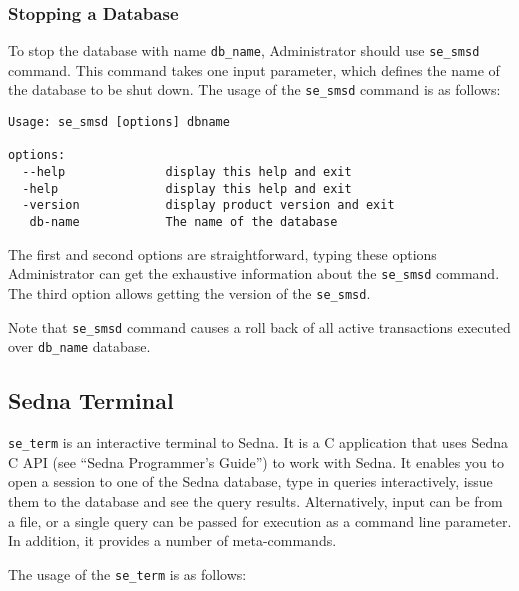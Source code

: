 \documentclass[a4paper,12pt]{article}
\begin{document}
\subsubsection{Stopping a Database}
\label{StopDB}

To stop the database with name \verb!db_name!, Administrator should use
\verb!se_smsd! command. This command takes one input parameter, which defines
the name of the database to be shut down. The usage of the \verb!se_smsd!
command is as follows:

\small{
\begin{verbatim}
Usage: se_smsd [options] dbname

options:
  --help              display this help and exit
  -help               display this help and exit
  -version            display product version and exit
   db-name            The name of the database
\end{verbatim}}

The first and second options are straightforward, typing these options
Administrator can get the exhaustive information about the \verb!se_smsd!
command. The third option allows getting the version of the \verb!se_smsd!.

Note that \verb!se_smsd! command causes a roll back of all active transactions
executed over \verb!db_name! database.


\subsection{Sedna Terminal}
\label{terminal}

\verb!se_term! is an interactive terminal to Sedna. It is a C application that
uses Sedna C API (see ``Sedna Programmer's Guide'') to work with Sedna. It
enables you to open a session to one of the Sedna database, type in queries
interactively, issue them to the database and see the query results.
Alternatively, input can be from a file, or a single query can be passed for
execution as a command line parameter. In addition, it provides a number of
meta-commands.

The usage of the \verb!se_term! is as follows:
\end{document}
